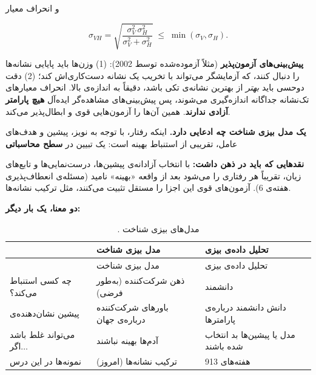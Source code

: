و انحراف معیار

\[
\sigma_{VH} = \sqrt{\frac{\sigma_V^2\,\sigma_H^2}{\sigma_V^2 + \sigma_H^2}} \;\le\; \min(\sigma_V, \sigma_H).
\]

\textbf{پیش‌بینی‌های آزمون‌پذیر} (مثلاً آزموده‌شده توسط  \lr{\&}
 2002): (1) وزن‌ها باید پایایی نشانه‌ها را دنبال کنند، که
آزمایشگر می‌تواند با تخریب یک نشانه دست‌کاری‌اش کند؛ (2) دقت دوحسی باید
\emph{بهتر} از بهترین نشانه‌ی تکی باشد، دقیقاً به اندازه‌ی بالا. انحراف
معیارهای تک‌نشانه جداگانه اندازه‌گیری می‌شوند، پس پیش‌بینی‌های مشاهده‌گر
ایده‌آل \textbf{هیچ پارامتر آزادی ندارند}. همین آن‌ها را آزمون‌هایی قوی و
ابطال‌پذیر می‌کند.

\textbf{یک مدل بیزی شناخت چه ادعایی دارد.} اینکه رفتار، با توجه به نویز،
پیشین و هدف‌های عامل، تقریبی از استنباط بهینه است: یک تبیین در
\textbf{سطح محاسباتی} 

\textbf{نقدهایی که باید در ذهن داشت:} با انتخاب آزادانه‌ی پیشین‌ها،
درست‌نمایی‌ها و تابع‌های زیان، تقریباً هر رفتاری را می‌شود بعد از واقعه
«بهینه» نامید (مسئله‌ی انعطاف‌پذیری هفته‌ی 6). آزمون‌های قوی این اجزا را
مستقل تثبیت می‌کنند، مثل ترکیب نشانه‌ها.

\textbf{دو معنا، یک بار دیگر:}

\begin{longtable}[]{@{}
  >{\raggedright\arraybackslash}p{}
  >{\raggedright\arraybackslash}p{}
  >{\raggedright\arraybackslash}p{}@{}}
\caption{. مدل‌های بیزی شناخت}\tabularnewline
\toprule\noalign{}
\begin{minipage}[b]{\linewidth}\raggedright
\end{minipage} & \begin{minipage}[b]{\linewidth}\raggedright
مدل بیزی شناخت
\end{minipage} & \begin{minipage}[b]{\linewidth}\raggedright
تحلیل داده‌ی بیزی
\end{minipage} \\
\midrule\noalign{}
\endfirsthead
\toprule\noalign{}
\begin{minipage}[b]{\linewidth}\raggedright
\end{minipage} & \begin{minipage}[b]{\linewidth}\raggedright
مدل بیزی شناخت
\end{minipage} & \begin{minipage}[b]{\linewidth}\raggedright
تحلیل داده‌ی بیزی
\end{minipage} \\
\midrule\noalign{}
\endhead
\bottomrule\noalign{}
\endlastfoot
چه کسی استنباط می‌کند؟ & ذهن شرکت‌کننده (به‌طور فرضی) & دانشمند \\
پیشین نشان‌دهنده‌ی & باورهای شرکت‌کننده درباره‌ی جهان & دانش دانشمند درباره‌ی
پارامترها \\
می‌تواند غلط باشد اگر\ensuremath{\ldots} & آدم‌ها بهینه نباشند & مدل یا پیشین‌ها بد
انتخاب شده باشند \\
نمونه‌ها در این درس & ترکیب نشانه‌ها (امروز) & هفته‌های 9\lr{--}13 \\
\end{longtable}

